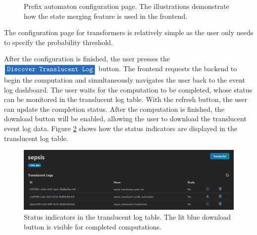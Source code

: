\begin{figure}[H]
\begin{subfigure}[b]{\textwidth}
    \end{subfigure}
    \caption{Prefix automaton configuration page. The illustrations demonstrate how the state merging feature is used in the frontend.}
    \label{fig:pa-merge}
\end{figure}

The configuration page for transformers is relatively simple as the user only needs to specify the probability threshold.

After the configuration is finished, the user presses the $\colorbox{NavyBlue}{\textcolor{white}{\texttt{Discover Translucent Log}}}$ button. The frontend requests the backend to begin the computation and simultaneously navigates the user back to the event log dashboard. The user waits for the computation to be completed, whose status can be monitored in the translucent log table. With the refresh button, the user can update the completion status. After the computation is finished, the download button will be enabled, allowing the user to download the translucent event log data. Figure \ref{fig:translucent-log-status} shows how the status indicators are displayed in the translucent log table.

\begin{figure}[H]
    \centering
    \includegraphics[width=\textwidth]{figures/screenshots/status.png}
    \caption{Status indicators in the translucent log table. The lit blue download button is visible for completed computations.}
    \label{fig:translucent-log-status}
\end{figure}

